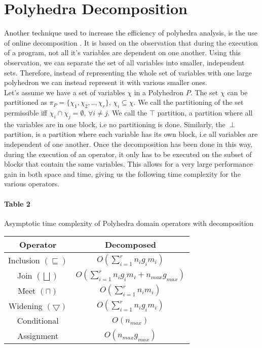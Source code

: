  \section{Polyhedra Decomposition}
Another technique used to increase the efficiency of polyhedra analysis, is the use of online decomposition \cite{singh2017fast}. It is based on the observation that during the execution of a program, not all it's variables are dependent on one another. Using this observation, we can separate the set of all variables into smaller, independent sets. Therefore, instead of representing the whole set of variables with one large polyhedron we can instead represent it with various smaller ones.\\ Let's assume we have a set of variables $\chi$ in a Polyhedron $P$. The set $\chi$ can be partitioned as $\pi_P=\{ \chi_1,\chi_2,..,\chi_r\}$, $\chi_i\subseteq\chi $. We call the partitioning of the set permissible iff $ \chi_i \cap \chi_j = \emptyset$, $ \forall i \neq j$. We call the $\top$ partition, a partition where all the variables are in one block, i.e no partitioning is done. Similarly, the $\perp$ partition, is a partition where each variable has its own block, i.e all variables are independent of one another. Once the decomposition has been done in this way, during the execution of an operator, it only has to be executed on the subset of blocks that contain the same variables. This allows for a very large performance gain in both space and time, giving us the following time complexity for the various operators.

\paragraph{Table 2} Asymptotic time complexity of Polyhedra domain operators with decomposition

\begin{center}
\begin{tabular}{||c c||} 
 
 \hline
 Operator & Decomposed  \\ [0.5ex] 
 \hline
 Inclusion $(\sqsubseteq)$ & $O(\sum_{i=1}^r n_ig_im_i)$\\ 
 \hline
 Join $(\bigsqcup)$ & $O(\sum_{i=1}^r n_i g_i m_i + n_{max} g_{max})$ \\
 \hline
 Meet $(\sqcap)$ & $O(\sum_{i=1}^r n_i m_i)$ \\
 \hline
 Widening $(\bigtriangledown)$ & $O(\sum_{i=1}^r n_i g_i m_i)$\\
 \hline
 Conditional & $O(n_{max})$ \\ 
 \hline
 Assignment & $O(n_{max}g_{max})$ \\ 
 
 
 \hline
\end{tabular}
\end{center}

